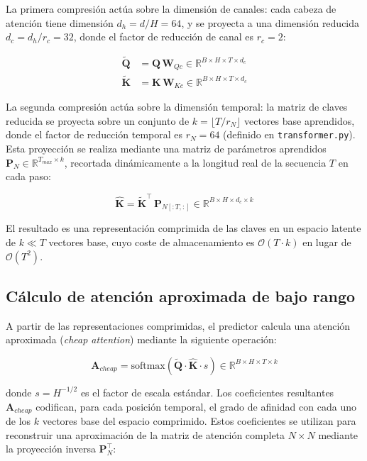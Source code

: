 La primera compresión actúa sobre la dimensión de canales: cada cabeza de atención tiene
dimensión $d_h = d / H = 64$, y se proyecta a una dimensión reducida
$d_c = d_h / r_c = 32$, donde el factor de reducción de canal es $r_c = 2$:

\begin{align}
    \tilde{\mathbf{Q}} &= \mathbf{Q} \, \mathbf{W}_{Qc} \in \mathbb{R}^{B \times H \times T \times d_c} \label{eq:q_reducido} \\
    \tilde{\mathbf{K}} &= \mathbf{K} \, \mathbf{W}_{Kc} \in \mathbb{R}^{B \times H \times T \times d_c} \label{eq:k_reducido}
\end{align}

La segunda compresión actúa sobre la dimensión temporal: la matriz de claves reducida
se proyecta sobre un conjunto de $k = \lfloor T / r_N \rfloor$ vectores base aprendidos,
donde el factor de reducción temporal es $r_N = 64$ (definido en \texttt{transformer.py}).
Esta proyección se realiza mediante una matriz de parámetros aprendidos
$\mathbf{P}_N \in \mathbb{R}^{T_{max} \times k}$, recortada dinámicamente a la longitud
real de la secuencia $T$ en cada paso:

\begin{equation}
    \hat{\mathbf{K}} = \tilde{\mathbf{K}}^{\top} \, \mathbf{P}_{N[:T,:]} \in \mathbb{R}^{B \times H \times d_c \times k}
    \label{eq:k_comprimido}
\end{equation}

El resultado es una representación comprimida de las claves en un espacio latente de
$k \ll T$ vectores base, cuyo coste de almacenamiento es $\mathcal{O}(T \cdot k)$ en
lugar de $\mathcal{O}(T^2)$.

\subsection{Cálculo de atención aproximada de bajo rango}
\label{subsec:cheap_attn}

A partir de las representaciones comprimidas, el predictor calcula una atención
aproximada (\textit{cheap attention}) mediante la siguiente operación:

\begin{equation}
    \mathbf{A}_{cheap} = \text{softmax}\!\left(\tilde{\mathbf{Q}} \cdot \hat{\mathbf{K}} \cdot s\right)
    \in \mathbb{R}^{B \times H \times T \times k}
    \label{eq:cheap_attn}
\end{equation}

donde $s = H^{-1/2}$ es el factor de escala estándar. Los coeficientes resultantes
$\mathbf{A}_{cheap}$ codifican, para cada posición temporal, el grado de afinidad con
cada uno de los $k$ vectores base del espacio comprimido. Estos coeficientes se utilizan
para reconstruir una aproximación de la matriz de atención completa $N \times N$ mediante
la proyección inversa $\mathbf{P}_{N}^{\top}$:

